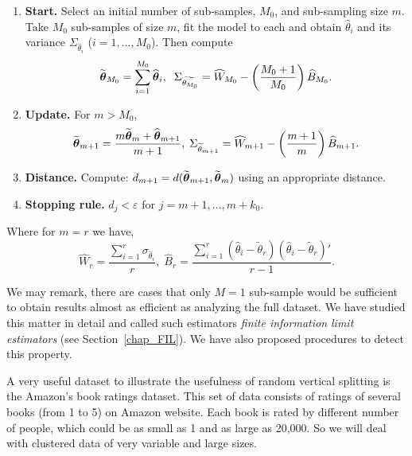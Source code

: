 \documentclass[11pt,a5paper,twoside]{book}
\newcommand{\bftheta}{\mbox{\boldmath $\theta$}}
\begin{document}
\begin{enumerate}
\item \textbf{Start.} Select an initial number of sub-samples, $M_0$, and sub-sampling size $m$. Take $M_0$ sub-samples of size $m$, fit the model to each and obtain $\widehat{\theta}_i$ and its variance $\Sigma_{\widehat{\theta}_i}$ ($i=1,\ldots,M_0$). Then compute 
\begin{equation}
\label{intro_comb_rules}
\widetilde{\bftheta}_{M_0} = \sum_{i=1}^{M_0} \widehat{\bftheta}_i,\;\; \Sigma_{\widetilde{\theta_{M_0}}}=\widehat{W}_{M_0} - \left( \frac{M_0+1}{M_0} \right) \widehat{B}_{M_0}.
\end{equation}

			\item \textbf{Update.} For $m>M_0$, \begin{equation}
	\label{introupdate}
	\widetilde{{\bftheta}}_{m+1}=\frac{m\widetilde{\bftheta}_m + \widehat{\bftheta}_{m+1}}{m+1},\; \Sigma_{\widetilde{\theta}_{m+1}}=\widehat{W}_{m+1} - \left( \frac{m+1}{m} \right) \widehat{B}_{m+1}.
	\end{equation}
	\item \textbf{Distance.} Compute: $d_{m+1}=d(\widetilde{\bftheta}_{m+1},\widetilde{\bftheta}_{m})$ using an appropriate distance.
	\item \textbf{Stopping rule.} $d_{j} < \varepsilon$ for $j=m+1,\ldots,m+k_0$.
\end{enumerate}
Where for $m=r$ we have,
\begin{equation}
\widehat{W}_r= \frac{\sum_{i=1}^r \sigma_{\widehat{\theta}_i}}{r},\; \widehat{B}_r= \frac{\sum_{i=1}^r (\widehat{\theta}_i - \widetilde{\theta}_r)(\widehat{\theta}_i - \widetilde{\theta}_r)'}{r-1}.
\end{equation}

We may remark, there are cases that only $M=1$ sub-sample would be sufficient to obtain results almost as efficient as analyzing the full dataset. We have studied this matter in detail and called such estimators \textit{finite information limit estimators} (see Section~\ref{chap_FIL}). We have also proposed procedures to detect this property.

A very useful dataset to illustrate the usefulness of random vertical splitting is the Amazon's book ratings dataset. This set of data consists of ratings of several books (from 1 to 5) on Amazon website. Each book is rated by different number of people, which could be as small as 1 and as large as 20,000. So we will deal with clustered data of very variable and large sizes. 
\end{document}
